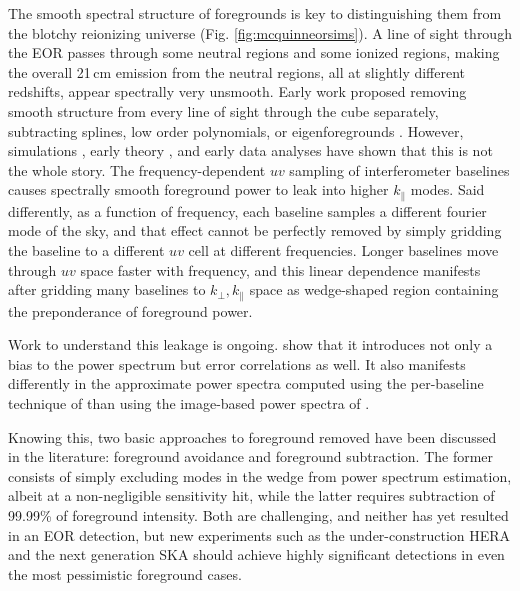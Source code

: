The smooth spectral structure of foregrounds is key to distinguishing them from the blotchy reionizing universe (Fig. \ref{fig:mcquinneorsims}). A line of sight through the EOR passes through some neutral regions and some ionized regions, making the overall 21\,cm emission from the neutral regions, all at slightly different redshifts, appear spectrally very unsmooth. Early work proposed removing smooth structure  from every line of sight through the cube separately, subtracting splines, low order polynomials, or eigenforegrounds \citep{Judd08, paper1, paper2,xiaomin,LOFAR2,Harker,Jelic08,MoralesBowmanHewittFGsub}. However, simulations \citep{Dattapowerspec}, early theory \citep{VedanthamWedge,MoralesPSShapes,CathWedge,nithya13}, and early data analyses have shown that this is not the whole story. The frequency-dependent $uv$ sampling of interferometer baselines causes spectrally smooth foreground power to leak into higher $k_\parallel$ modes. Said differently, as a function of frequency, each baseline samples a different fourier mode of the sky, and that effect cannot be perfectly removed by simply gridding the baseline to a different $uv$ cell at different frequencies. Longer baselines move through $uv$ space faster with frequency, and this linear dependence manifests after gridding many baselines to $k_\perp,k_\parallel$ space as wedge-shaped region containing the preponderance of foreground power. 

Work to understand this leakage is ongoing. \citet{AdrianWedge1,AdrianWedge2} show that it introduces not only a bias to the power spectrum but error correlations as well. It also manifests differently \citep{pober13} in the approximate power spectra computed using the per-baseline technique of \citet{parsonsandbacker,parsons12b} than using the image-based power spectra of \citep{beardsley16,dillonneben,X13}. 

Knowing this, two basic approaches to foreground removed have been discussed in the literature: foreground avoidance and foreground subtraction. The former consists of simply excluding modes in the wedge from power spectrum estimation, albeit at a non-negligible sensitivity hit, while the latter requires subtraction of 99.99\% of foreground intensity. Both are challenging, and neither has yet resulted in an EOR detection, but new experiments such as the under-construction HERA \citep{neben16,ewallwice16,nithya16,deboer16} and the next generation SKA \citep{ska,ska1,ska2,ska3} should achieve highly significant detections in even the most pessimistic foreground cases. 

